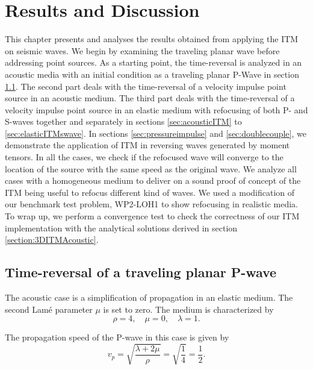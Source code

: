 \chapter{Results and Discussion}\label{chapter:Results}
This chapter presents and analyses the results obtained from applying the \ac{ITM} on seismic waves.
We begin by examining the traveling planar wave before addressing point sources. 
As a starting point, the time-reversal is analyzed in an acoustic media with an initial condition
as a traveling planar P-Wave in section \ref{sec:acoustictravelling}. The second part deals with the time-reversal of a velocity impulse point source in an acoustic medium. The third part deals with the time-reversal
of a velocity impulse point source in an elastic medium with refocusing of both P- and S-waves together and separately in sections \ref{sec:acousticITM} to \ref{sec:elasticITMswave}. 
In sections \ref{sec:pressureimpulse} and \ref{sec:doublecouple}, we demonstrate the application of \ac{ITM} in reversing waves generated by moment tensors. In all the cases, we check if the refocused wave will converge to the location of the source with the same speed as the original wave. We analyze all cases with a homogeneous medium to deliver on a sound proof of concept of the \ac{ITM} being useful to refocus different kind of waves. We used a modification
of our benchmark test problem, WP2-LOH1 to show refocusing in realistic media.\\
To wrap up, we perform a convergence test to check the correctness of our \ac{ITM} implementation with the analytical solutions derived in section \ref{section:3DITMAcoustic}.

\section{Time-reversal of a traveling planar P-wave} \label{sec:acoustictravelling}
The acoustic case is a simplification of propagation in an elastic medium. The second Lam\'{e} parameter $\mu$ is set to zero. The medium is characterized by
\begin{equation}
    \rho = 4, \quad \mu = 0, \quad \lambda = 1 .
\end{equation}

The propagation speed of the P-wave in this case is given by
\begin{equation}
    v_p = \sqrt{\frac{\lambda + 2 \mu}{\rho}} = \sqrt{\frac{1}{4}} = \frac{1}{2} .
\end{equation}

